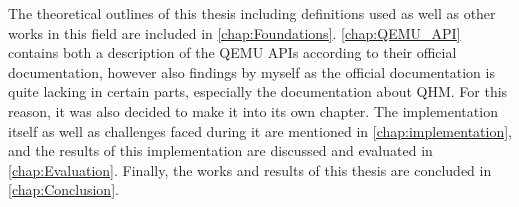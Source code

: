 The theoretical outlines of this thesis including definitions used as well as other works in this field are included in \autoref{chap:Foundations}.
\autoref{chap:QEMU_API} contains both a description of the QEMU APIs according to their official documentation,
however also findings by myself as the official documentation is quite lacking in certain parts, especially the documentation about QHM.
For this reason, it was also decided to make it into its own chapter.
The implementation itself as well as challenges faced during it are mentioned in \autoref{chap:implementation},
and the results of this implementation are discussed and evaluated in \autoref{chap:Evaluation}.
Finally, the works and results of this thesis are concluded in \autoref{chap:Conclusion}.
